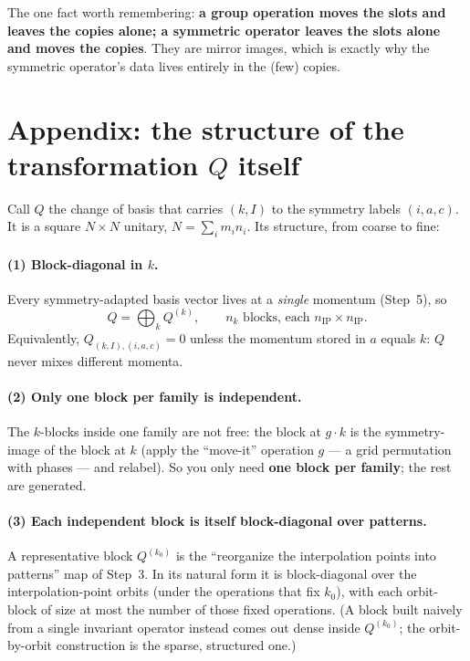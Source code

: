 \documentclass[11pt]{article}
\begin{document}
The one fact worth remembering: \textbf{a group operation moves the slots and leaves the copies alone;
a symmetric operator leaves the slots alone and moves the copies}. They are mirror images, which is
exactly why the symmetric operator's data lives entirely in the (few) copies.

\section*{Appendix: the structure of the transformation $Q$ itself}

Call $Q$ the change of basis that carries $(k,I)$ to the symmetry labels $(i,a,c)$. It is a square
$N\times N$ unitary, $N=\sum_i m_i n_i$. Its structure, from coarse to fine:

\paragraph{(1) Block-diagonal in $k$.} Every symmetry-adapted basis vector lives at a \emph{single}
momentum (Step~5), so
\[
   Q=\bigoplus_{k} Q^{(k)},\qquad \text{$n_k$ blocks, each } n_{\mathrm{IP}}\times n_{\mathrm{IP}} .
\]
Equivalently, $Q_{(k,I),(i,a,c)}=0$ unless the momentum stored in $a$ equals $k$: $Q$ never mixes
different momenta.

\paragraph{(2) Only one block per family is independent.} The $k$-blocks inside one family are not
free: the block at $g\!\cdot\!k$ is the symmetry-image of the block at $k$ (apply the ``move-it''
operation $g$ --- a grid permutation with phases --- and relabel). So you only need \textbf{one block
per family}; the rest are generated.

\paragraph{(3) Each independent block is itself block-diagonal over patterns.} A representative block
$Q^{(k_0)}$ is the ``reorganize the interpolation points into patterns'' map of Step~3. In its natural
form it is block-diagonal over the interpolation-point orbits (under the operations that fix $k_0$),
with each orbit-block of size at most the number of those fixed operations. (A block built naively
from a single invariant operator instead comes out dense inside $Q^{(k_0)}$; the orbit-by-orbit
construction is the sparse, structured one.)
\end{document}
